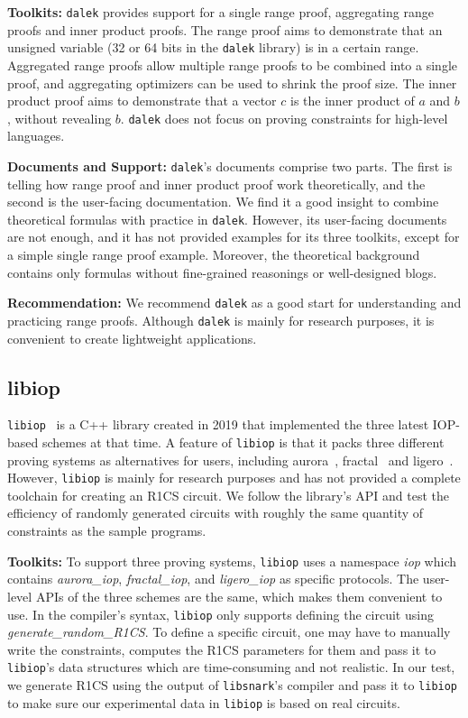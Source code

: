 \documentclass[letterpaper,twocolumn,10pt]{article}
\theoremstyle{definition}
\newcommand{\mypara}[1]{\noindent\textbf{{#1: }}}
\newcommand{\new}[1]{{#1}\xspace}
\newcommand{\lib}[1]{\texttt{#1}\xspace}
\begin{document}
\mypara{Toolkits} \lib{dalek} provides support for a single range proof, aggregating range proofs and inner product proofs. The range proof aims to demonstrate that an unsigned variable (32 or 64 bits in the \lib{dalek} library) is in a certain range. Aggregated range proofs allow multiple range proofs to be combined into a single proof, and aggregating optimizers can be used to shrink the proof size. The inner product proof aims to demonstrate that a vector $c$ is the inner product of $a$ and $b$, without revealing $b$. \lib{dalek} does not focus on proving constraints for high-level languages.

\mypara{Documents and Support} \lib{dalek}'s documents comprise two parts. The first is telling how range proof and inner product proof work theoretically, and the second is the user-facing documentation. We find it a good insight to combine theoretical formulas with practice in \lib{dalek}. However, its user-facing documents are not enough, and it has not provided examples for its three toolkits, except for a simple single range proof example. Moreover, the theoretical background contains only formulas without fine-grained reasonings or well-designed blogs.

\mypara{Recommendation} We recommend \lib{dalek} as a good start for understanding and practicing range proofs. Although \lib{dalek} is mainly for research purposes, it is convenient to create lightweight applications.

\subsection{libiop}
\lib{libiop}~\cite{libiop} is a C++ library created in 2019 that implemented the three latest IOP-based schemes at that time. 
A feature of \lib{libiop} is that it packs three different proving systems as alternatives for users, including aurora~\cite{ben2019aurora}, fractal~\cite{chiesa2020fractal} and ligero~\cite{ames2017ligero}.
However, \lib{libiop} is mainly for research purposes and has not provided a complete toolchain for creating an R1CS circuit. \new{We follow the library's API and test the efficiency of randomly generated circuits with roughly the same quantity of constraints as the sample programs.}

\mypara{Toolkits} To support three proving systems, \lib{libiop} uses a namespace \textit{iop} which contains \textit{aurora\_iop}, \textit{fractal\_iop}, and \textit{ligero\_iop} as specific protocols. The user-level APIs of the three schemes are the same, which makes them convenient to use. \new{In the compiler's syntax, \lib{libiop} only supports defining the circuit using \textit{generate\_random\_R1CS}. To define a specific circuit, one may have to manually write the constraints, computes the R1CS parameters for them and pass it to \lib{libiop}'s data structures which are time-consuming and not realistic. In our test, we generate R1CS using the output of \lib{libsnark}'s compiler and pass it to \lib{libiop} to make sure our experimental data in \lib{libiop} is based on real circuits.
}
\end{document}
